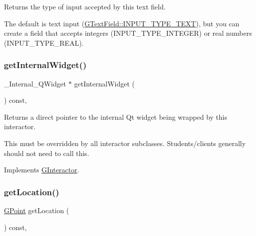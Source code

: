 Returns the type of input accepted by this text field. 

The default is text input (\mbox{\hyperlink{classsgl_1_1GTextField_a5fc772c800c3d40d2b95564e8a839babadbd6303eaf17fd7715ddca85f2ac3287}{G\+Text\+Field\+::\+I\+N\+P\+U\+T\+\_\+\+T\+Y\+P\+E\+\_\+\+T\+E\+XT}}), but you can create a field that accepts integers (I\+N\+P\+U\+T\+\_\+\+T\+Y\+P\+E\+\_\+\+I\+N\+T\+E\+G\+ER) or real numbers (I\+N\+P\+U\+T\+\_\+\+T\+Y\+P\+E\+\_\+\+R\+E\+AL). \mbox{\label{classsgl_1_1GTextField_a2f6b36b2517087dc90a366b5ce1f5323}} 
\subsubsection{\texorpdfstring{get\+Internal\+Widget()}{getInternalWidget()}}
{\footnotesize\ttfamily \+\_\+\+Internal\+\_\+\+Q\+Widget $\ast$ get\+Internal\+Widget (\begin{DoxyParamCaption}{ }\end{DoxyParamCaption}) const\hspace{0.3cm}{\ttfamily [override]}, {\ttfamily [virtual]}}



Returns a direct pointer to the internal Qt widget being wrapped by this interactor. 

This must be overridden by all interactor subclasses. Students/clients generally should not need to call this. 

Implements \mbox{\hyperlink{classsgl_1_1GInteractor}{G\+Interactor}}.

\mbox{\label{classsgl_1_1GInteractor_a4f83802015511edeb63b892830812c11}} 
\subsubsection{\texorpdfstring{get\+Location()}{getLocation()}}
{\footnotesize\ttfamily \mbox{\hyperlink{structsgl_1_1GPoint}{G\+Point}} get\+Location (\begin{DoxyParamCaption}{ }\end{DoxyParamCaption}) const\hspace{0.3cm}{\ttfamily [virtual]}, {\ttfamily [inherited]}}



